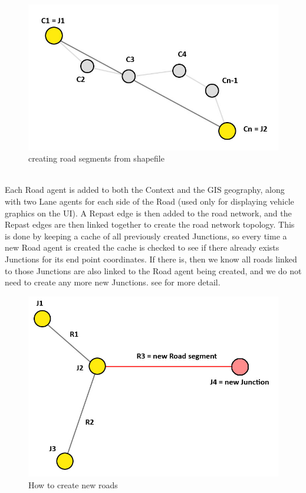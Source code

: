 \documentclass[11pt]{article}
\begin{document}
\begin{figure}[H]
\begin{center}
\includegraphics[scale=0.4]{creating_road_segments_from_shapefile}
\caption{creating road segments from shapefile}
\end{center}
\end{figure}

\\
Each Road agent is added to both the Context and the GIS geography, along with two Lane agents for each side of the Road (used only for displaying vehicle graphics on the UI). A Repast edge is then added to the road network, and the Repast edges are then linked together to create the road network topology. This is done by keeping a cache of all previously created Junctions, so every time a new Road agent is created the cache is checked to see if there already exists Junctions for its end point coordinates. If there is, then we know all roads linked to those Junctions are also linked to the Road agent being created, and we do not need to create any more new Junctions. see \cite{3c} for more detail. 
\\

\begin{figure}[H]
\begin{center}
\includegraphics[scale=0.3]{creating_new_roads}
\caption{How to create new roads}
\end{center}
\end{figure}
\end{document}
